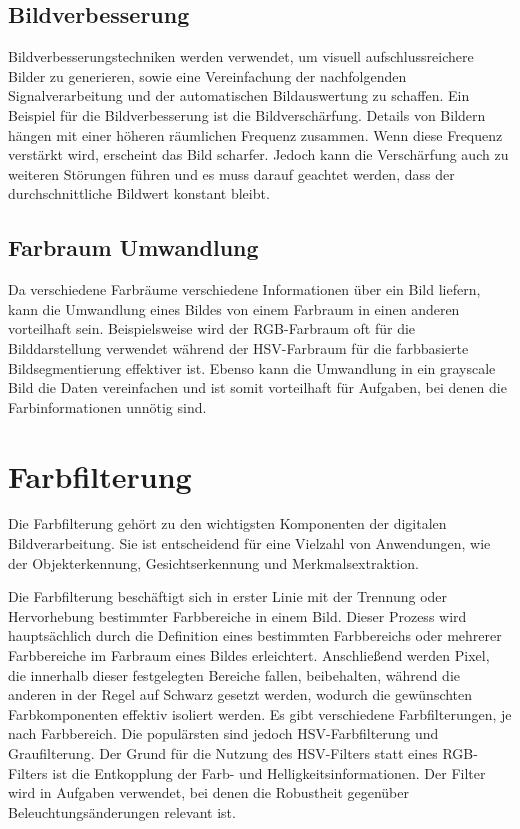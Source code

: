 \subsection{Bildverbesserung}
Bildverbesserungstechniken werden verwendet, um visuell aufschlussreichere Bilder zu generieren, 
sowie eine Vereinfachung der nachfolgenden Signalverarbeitung und der automatischen Bildauswertung zu schaffen. Ein Beispiel für die 
Bildverbesserung ist die Bildverschärfung. Details von Bildern hängen mit einer höheren räumlichen Frequenz zusammen. Wenn diese Frequenz 
verstärkt wird, erscheint das Bild scharfer. Jedoch kann die Verschärfung auch zu weiteren Störungen führen und es muss darauf geachtet werden,
dass der durchschnittliche Bildwert konstant bleibt.~\cite{Jürgen_Beyerer_Fernando_Puente_León_Christian_Frese__2023_springer}

\subsection{Farbraum Umwandlung}
Da verschiedene Farbräume verschiedene Informationen über ein Bild liefern, kann die Umwandlung eines Bildes von einem Farbraum in einen anderen 
vorteilhaft sein. Beispielsweise wird der RGB-Farbraum oft für die Bilddarstellung verwendet während der HSV-Farbraum für die farbbasierte Bildsegmentierung
effektiver ist. Ebenso kann die Umwandlung in ein grayscale Bild die Daten vereinfachen und ist somit vorteilhaft für Aufgaben, bei denen die Farbinformationen
unnötig sind.~\cite{Noor_A._Ibraheem_2012_psu}

\section{Farbfilterung}
Die Farbfilterung gehört zu den wichtigsten Komponenten der digitalen Bildverarbeitung. Sie ist entscheidend für eine Vielzahl von Anwendungen,
wie der Objekterkennung, Gesichtserkennung und Merkmalsextraktion.

Die Farbfilterung beschäftigt sich in erster Linie mit der Trennung oder Hervorhebung bestimmter Farbbereiche in einem Bild. Dieser Prozess wird hauptsächlich durch
die Definition eines bestimmten Farbbereichs oder mehrerer Farbbereiche im Farbraum eines Bildes erleichtert. Anschließend werden Pixel, die innerhalb 
dieser festgelegten Bereiche fallen, beibehalten, während die anderen in der Regel auf Schwarz gesetzt werden, 
wodurch die gewünschten Farbkomponenten effektiv isoliert werden. Es gibt verschiedene Farbfilterungen, je nach Farbbereich. 
Die populärsten sind jedoch HSV-Farbfilterung und Graufilterung. Der Grund für die Nutzung des HSV-Filters statt eines RGB-Filters 
ist die Entkopplung der Farb- und Helligkeitsinformationen. Der Filter wird in Aufgaben verwendet, bei denen die Robustheit gegenüber 
Beleuchtungsänderungen relevant ist. 

